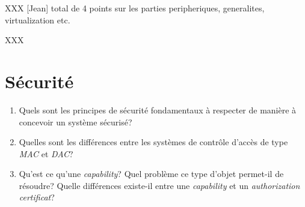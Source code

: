 XXX [Jean] total de 4 points sur les parties peripheriques, generalites,
           virtualization etc.

\begin{correction}

XXX

\end{correction}

% 
%

\section{S\'ecurit\'e
         }

\begin{enumerate}
  \item
    Quels sont les principes de s\'ecurit\'e fondamentaux \`a respecter
    de mani\`ere \`a concevoir un syst\`eme s\'ecuris\'e?
  \item
    Quelles sont les diff\'erences entre les syst\`emes de contr\^ole d'acc\`es
    de type \textit{MAC} et \textit{DAC}?
  \item
    Qu'est ce qu'une \textit{capability}? Quel probl\`eme ce type d'objet
    permet-il de r\'esoudre? Quelle diff\'erences existe-il entre une
    \textit{capability} et un \textit{authorization certificat}?
\end{enumerate}

